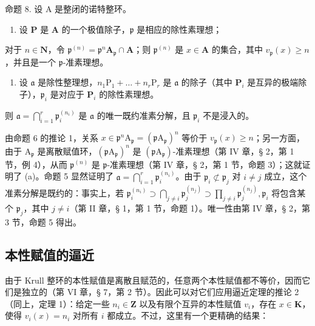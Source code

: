 命题 8. 设 A 是整闭的诺特整环。

\begin{enumerate}
\def\labelenumi{(\alph{enumi})}
\tightlist
\item
  设 \(\mathbf{P}\) 是 \(\mathbf{A}\) 的一个极值除子，\(\mathfrak{p}\) 是相应的除性素理想；
\end{enumerate}

对于 \(n \in \mathbf{N}\)，令 \(\mathfrak{p}^{(n)} = \mathfrak{p}^n\mathbf{A}_{\mathfrak{p}} \cap \mathbf{A}\)；则 \(\mathfrak{p}^{(n)}\) 是 \(x \in \mathbf{A}\) 的集合，其中 \(v_{\mathfrak{p}}(x) \geqslant n\)，并且是一个 \(\mathfrak{p}\)-准素理想。

\begin{enumerate}
\def\labelenumi{(\alph{enumi})}
\setcounter{enumi}{1}
\tightlist
\item
  设 \(\mathfrak{a}\) 是除性整理想，\(n_1\mathrm{P}_1 + \dots + n_r\mathrm{P}_r\) 是 \(\mathfrak{a}\) 的除子（其中 \(\mathbf{P}_i\) 是互异的极端除子），\(\mathfrak{p}_i\) 是对应于 \(\mathbf{P}_i\) 的除性素理想。
\end{enumerate}

则 \(\mathfrak{a} = \bigcap_{i=1}^{r} \mathfrak{p}_i^{(n_i)}\) 是 \(\mathfrak{a}\) 的唯一既约准素分解，且 \(\mathfrak{p}_i\) 不是浸入的。

由命题 6 的推论 1，关系 \(x \in \mathfrak{p}^n\mathrm{A}_{\mathfrak{p}} = (\mathfrak{p}\mathrm{A}_{\mathfrak{p}})^n\) 等价于 \(v_{\mathfrak{p}}(x) \geqslant n\)；另一方面，由于 \(\mathrm{A}_{\mathfrak{p}}\) 是离散赋值环，\((\mathfrak{p}\mathrm{A}_{\mathfrak{p}})^n\) 是 \((\mathfrak{p}\mathrm{A}_{\mathfrak{p}})\)-准素理想（第 IV 章，§ 2，第 1 节，例 4），从而 \(\mathfrak{p}^{(n)}\) 是 \(\mathfrak{p}\)-准素理想（第 IV 章，§ 2，第 1 节，命题 3）；这就证明了 (a)。命题 5 显然证明了 \(\mathfrak{a} = \bigcap_{i=1}^{r} \mathfrak{p}_i^{(n_i)}\)。由于 \(\mathfrak{p}_i \not\subset \mathfrak{p}_j\) 对 \(i \neq j\) 成立，这个准素分解是既约的：事实上，若 \(\mathfrak{p}_i^{(n_i)} \supset \bigcap_{j \neq i} \mathfrak{p}_j^{(n_j)} \supset \prod_{j \neq i} \mathfrak{p}_j^{(n_j)}, \mathfrak{p}_i\) 将包含某个 \(\mathfrak{p}_j\)，其中 \(j \neq i\)（第 II 章，§ 1，第 1 节，命题 1）。唯一性由第 IV 章，§ 2，第 3 节，命题 5 得出。

\subsection{本性赋值的逼近}

由于 Krull 整环的本性赋值是离散且赋范的，任意两个本性赋值都不等价，因而它们是独立的（第 VI 章，§ 7，第 2 节）。因此可以对它们应用逼近定理的推论 2（同上，定理 1）：给定一些 \(n_i \in \mathbf{Z}\) 以及有限个互异的本性赋值 \(v_i\)，存在 \(x \in \mathbf{K}\)，使得 \(v_i(x) = n_i\) 对所有 \(i\) 都成立。不过，这里有一个更精确的结果：

